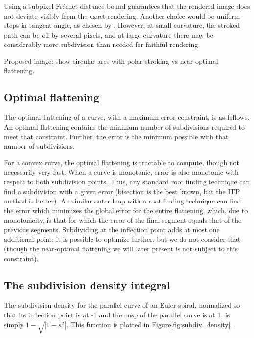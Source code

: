 \documentclass[format=acmsmall]{acmart}
\begin{document}
Using a subpixel Fréchet distance bound guarantees that the rendered image does not deviate visibly from the exact rendering. Another choice would be uniform steps in tangent angle, as chosen by \cite{Kilgard2020}. However, at small curvature, the stroked path can be off by several pixels, and at large curvature there may be considerably more subdivision than needed for faithful rendering.

Proposed image: show circular arcs with polar stroking vs near-optimal flattening.

\subsection{Optimal flattening}

The optimal flattening of a curve, with a maximum error constraint, is as follows. An optimal flattening contains the minimum number of subdivisions required to meet that constraint. Further, the error is the minimum possible with that number of subdivisions.

For a convex curve, the optimal flattening is tractable to compute, though not necessarily very fast. When a curve is monotonic, error is also monotonic with respect to both subdivision points. Thus, any standard root finding technique can find a subdivision with a given error (bisection is the best known, but the ITP method \cite{Oliveira2020} is better). An similar outer loop with a root finding technique can find the error which minimizes the global error for the entire flattening, which, due to monotonicity, is that for which the error of the final segment equals that of the previous segments. Subdividing at the inflection point adds at most one additional point; it is possible to optimize further, but we do not consider that (though the near-optimal flattening we will later present is not subject to this constraint).

\subsection{The subdivision density integral}

The subdivision density for the parallel curve of an Euler spiral, normalized so that its inflection point is at -1 and the cusp of the parallel curve is at 1, is simply $1 - \sqrt{|1-s^2|}$. This function is plotted in Figure\ref{fig:subdiv_density}.
\end{document}
